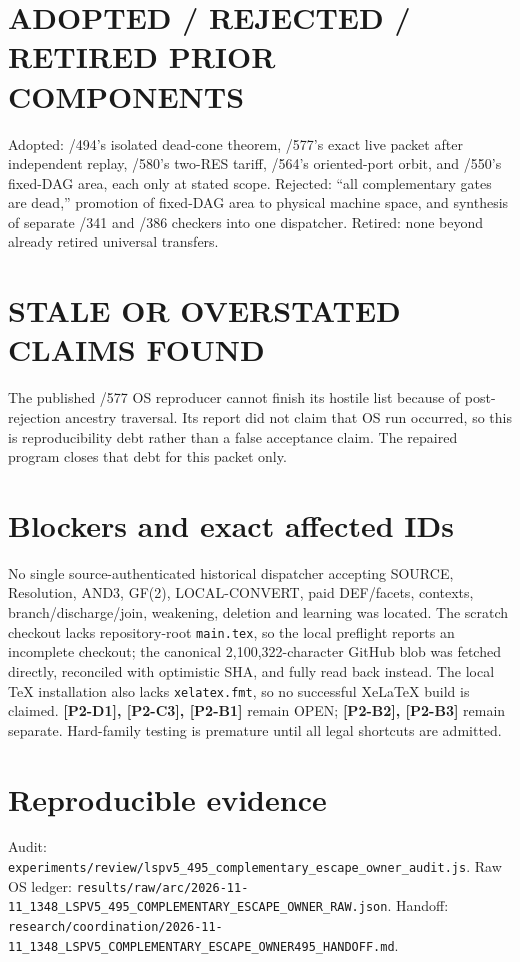 \documentclass[11pt]{article}
\begin{document}
\section*{ADOPTED / REJECTED / RETIRED PRIOR COMPONENTS}
Adopted: /494's isolated dead-cone theorem, /577's exact live packet after
independent replay, /580's two-RES tariff, /564's oriented-port orbit, and
/550's fixed-DAG area, each only at stated scope. Rejected: ``all complementary
gates are dead,'' promotion of fixed-DAG area to physical machine space, and
synthesis of separate /341 and /386 checkers into one dispatcher. Retired:
none beyond already retired universal transfers.

\section*{STALE OR OVERSTATED CLAIMS FOUND}
The published /577 OS reproducer cannot finish its hostile list because of
post-rejection ancestry traversal. Its report did not claim that OS run
occurred, so this is reproducibility debt rather than a false acceptance claim.
The repaired program closes that debt for this packet only.

\section*{Blockers and exact affected IDs}
No single source-authenticated historical dispatcher accepting SOURCE,
Resolution, AND3, GF(2), LOCAL-CONVERT, paid DEF/facets, contexts,
branch/discharge/join, weakening, deletion and learning was located.
The scratch checkout lacks repository-root \texttt{main.tex}, so the local
preflight reports an incomplete checkout; the canonical 2,100,322-character
GitHub blob was fetched directly, reconciled with optimistic SHA, and fully read
back instead. The local TeX installation also lacks \texttt{xelatex.fmt}, so no
successful XeLaTeX build is claimed.
\textbf{[P2-D1], [P2-C3], [P2-B1]} remain OPEN;
\textbf{[P2-B2], [P2-B3]} remain separate. Hard-family testing is premature
until all legal shortcuts are admitted.

\section*{Reproducible evidence}
Audit:
\texttt{experiments/review/lspv5\_495\_complementary\_escape\_owner\_audit.js}.
Raw OS ledger:
\texttt{results/raw/arc/2026-11-11\_1348\_LSPV5\_495\_COMPLEMENTARY\_ESCAPE\_OWNER\_RAW.json}.
Handoff:
\texttt{research/coordination/2026-11-11\_1348\_LSPV5\_COMPLEMENTARY\_ESCAPE\_OWNER495\_HANDOFF.md}.
\end{document}
